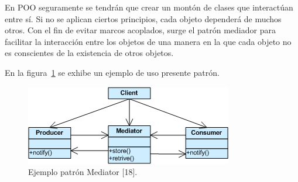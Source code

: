 \par En POO seguramente se tendrán que crear un montón de clases que interactúan entre sí. Si no se aplican ciertos principios, cada objeto dependerá de muchos otros. Con el fin de evitar marcos acoplados, surge el patrón mediador para facilitar la interacción entre los objetos de una manera en la que cada objeto no es conscientes de la existencia de otros objetos.

\par En la figura~\ref{mediador} se exhibe un ejemplo de uso presente patrón.

\begin{figure}[h!]
	\centering
		\includegraphics[scale=0.7]{image/mediador.png}
	\caption{Ejemplo patrón Mediator [18].}
	\label{mediador} 
\end{figure}
